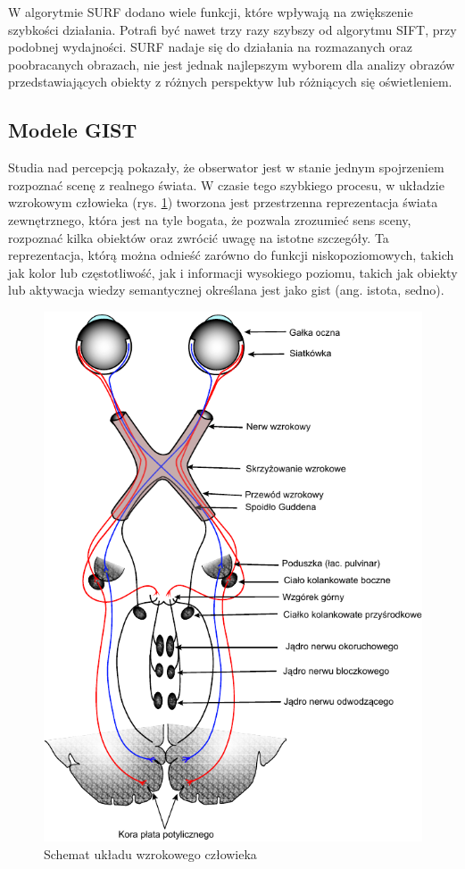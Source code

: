 W algorytmie SURF dodano wiele funkcji, które wpływają na zwiększenie szybkości działania. Potrafi być nawet trzy razy szybszy od algorytmu SIFT, przy podobnej wydajności. SURF nadaje się do działania na rozmazanych oraz poobracanych obrazach, nie jest jednak najlepszym wyborem dla analizy obrazów przedstawiających obiekty z różnych perspektyw lub różniących się oświetleniem. 

\subsection{Modele GIST}

Studia nad percepcją pokazały, że obserwator jest w stanie jednym spojrzeniem rozpoznać scenę z realnego świata. W czasie tego szybkiego procesu, w układzie wzrokowym człowieka (rys. \ref{fig:gist-vision-system}) tworzona jest przestrzenna reprezentacja świata zewnętrznego, która jest na tyle bogata, że pozwala zrozumieć sens sceny, rozpoznać kilka obiektów oraz zwrócić uwagę na istotne szczegóły. Ta reprezentacja, którą można odnieść zarówno do funkcji niskopoziomowych, takich jak kolor lub częstotliwość, jak i informacji wysokiego poziomu, takich jak obiekty lub aktywacja wiedzy semantycznej określana jest jako gist (ang. istota, sedno).

\begin{figure}[h]
	\centering
	\includegraphics[scale=1.0]{graphics/01_podstawy_teoretyczne/gist-vision-system.pdf}
	\caption{Schemat układu wzrokowego człowieka \cite{GRAY18}}
	\label{fig:gist-vision-system}
\end{figure}

